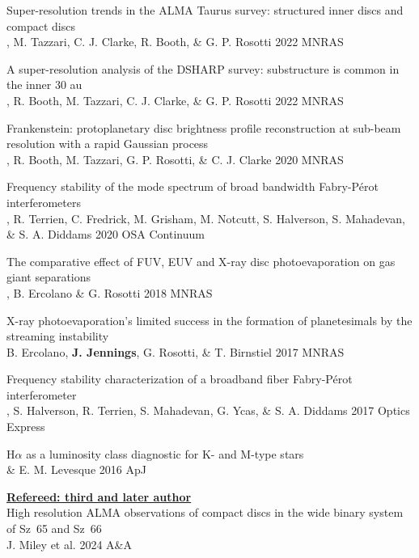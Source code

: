 \documentclass[10pt,preprint]{aastex}
\begin{document}
\noindent Super-resolution trends in the ALMA Taurus survey: structured inner discs and compact discs \\
, M. Tazzari, C. J. Clarke, R. Booth, \& G. P. Rosotti 2022 MNRAS 

\noindent A super-resolution analysis of the DSHARP survey: substructure is common in the inner 30 au \\
, R. Booth, M. Tazzari, C. J. Clarke, \& G. P. Rosotti 2022 MNRAS

\noindent Frankenstein: protoplanetary disc brightness profile reconstruction at sub-beam resolution with a rapid Gaussian process \\
, R. Booth, M. Tazzari, G. P. Rosotti, \& C. J. Clarke 2020 MNRAS

\noindent Frequency stability of the mode spectrum of broad bandwidth Fabry-P{\'e}rot interferometers \\
, R. Terrien, C. Fredrick, M. Grisham, M. Notcutt, S. Halverson, S. Mahadevan, \\ 
\indent \& S. A. Diddams 2020 OSA Continuum 

\noindent The comparative effect of FUV, EUV and X-ray disc photoevaporation on gas giant separations \\
, B. Ercolano \& G. Rosotti 2018 MNRAS 

\noindent X-ray photoevaporation's limited success in the formation of planetesimals by the streaming instability\\
\indent B. Ercolano, {\bf J. Jennings}, G. Rosotti, \& T. Birnstiel 2017 MNRAS


\noindent Frequency stability characterization of a broadband fiber Fabry-P{\'e}rot interferometer \\
, S. Halverson, R. Terrien, S. Mahadevan, G. Ycas, \& S. A. Diddams 2017 Optics Express

\noindent H$\alpha$ as a luminosity class diagnostic for K- and M-type stars \\
 \& E. M. Levesque 2016 ApJ 

\noindent \underline{{\bf Refereed: third and later author}} \\
\noindent High resolution ALMA observations of compact discs in the wide binary system of Sz~65 and Sz~66\\
\indent J. Miley et al. 2024 A\&A
\end{document}
